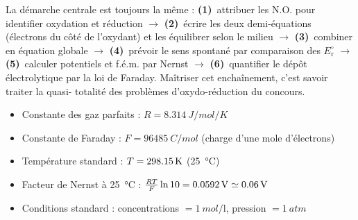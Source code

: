\documentclass[11pt,a4paper]{article}
\newcommand{\NO}{\ensuremath{\mathrm{N.O.}}}    %
\begin{document}
\begin{remarque}
La démarche centrale est toujours la même : \textbf{(1)}~attribuer les $\NO$ pour identifier
oxydation et réduction $\to$ \textbf{(2)}~écrire les deux demi-équations (électrons du côté de
l'oxydant) et les équilibrer selon le milieu $\to$ \textbf{(3)}~combiner en équation globale
$\to$ \textbf{(4)}~prévoir le sens spontané par comparaison des $E_{\mathrm{r}}^{\circ}$ $\to$
\textbf{(5)}~calculer potentiels et f.é.m. par Nernst $\to$ \textbf{(6)}~quantifier le dépôt
électrolytique par la loi de Faraday. Maîtriser cet enchaînement, c'est savoir traiter la quasi-
totalité des problèmes d'oxydo-réduction du concours.
\end{remarque}

\vspace{0.3cm}
\begin{tcolorbox}[boxbase,colback=remarkcol!6,colframe=remarkcol,
   title={\textsc{Constantes utiles}}]
\begin{itemize}[leftmargin=1.6em,topsep=1pt,itemsep=1pt]
  \item Constante des gaz parfaits : $R=\SI{8.314}{J\per mol\per K}$
  \item Constante de Faraday : $F=\SI{96485}{C\per mol}$ (charge d'une mole d'électrons)
  \item Température standard : $T=\SI{298{,}15}{K}$ (\SI{25}{\celsius})
  \item Facteur de Nernst à \SI{25}{\celsius} : $\tfrac{RT}{F}\ln 10=\SI{0{,}0592}{V}\simeq\SI{0{,}06}{V}$
  \item Conditions standard : concentrations $=\SI{1}{mol\per\litre}$, pression $=\SI{1}{atm}$
\end{itemize}
\end{tcolorbox}
\end{document}
